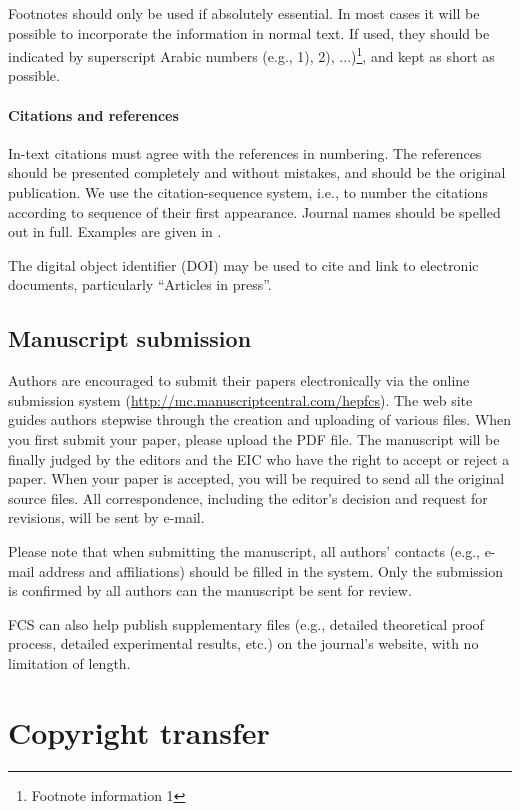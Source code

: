 \documentclass[review]{fcs}
\begin{document}
Footnotes should only be used if absolutely essential. In most cases it will be possible to incorporate the information in normal text. If used, they should be indicated by superscript Arabic numbers (e.g., 1), 2), ...)\footnote{Footnote information 1}, and kept as short as possible.

\paragraph{Citations and references}

In-text citations must agree with the references in numbering. The references should be presented completely and without mistakes, and should be the original publication. We use the citation-sequence system, i.e., to number the citations according to sequence of their first appearance. Journal names should be spelled out in full. Examples are given in \cite{1,2,3}.

The digital object identifier (DOI) may be used to cite and link to electronic documents, particularly ``Articles in press''.

\subsection{Manuscript submission}

Authors are encouraged to submit their papers electronically via the online submission system (\url{http://mc.manuscriptcentral.com/hepfcs}). The web site guides authors stepwise through the creation and uploading of various files. When you first submit your paper, please upload the PDF file. The manuscript will be finally judged by the editors and the EIC who have the right to accept or reject a paper. When your paper is accepted, you will be required to send all the original source files. All correspondence, including the editor's decision and request for revisions, will be sent by e-mail.

Please note that when submitting the manuscript, all authors' contacts (e.g., e-mail address and affiliations) should be filled in the system. Only the submission is confirmed by all authors can the manu\-script be sent for review.

FCS can also help publish supplementary files (e.g., detailed theoretical proof process, detailed experimental results, etc.) on the journal's website, with no limitation of length.

\section{Copyright transfer}
\end{document}
